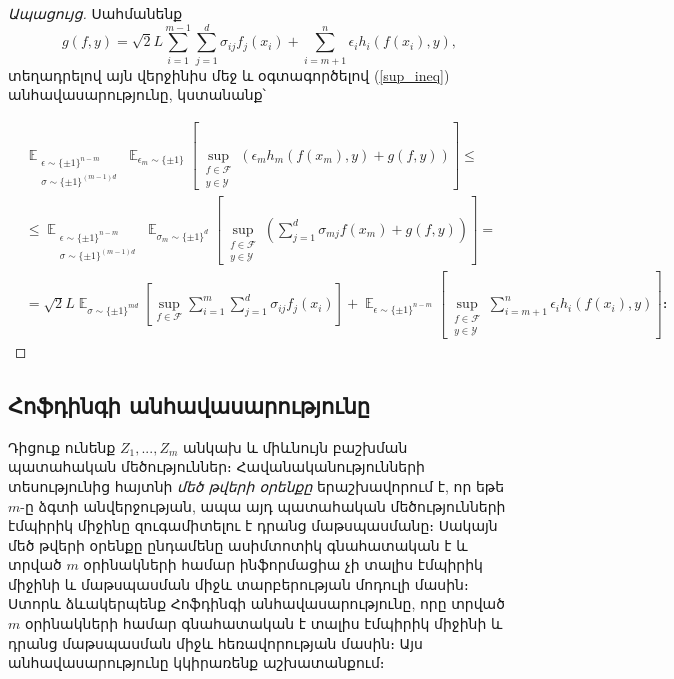 \documentclass[12pt]{article}
\DeclareMathOperator*{\E}{\mathbb{E}}
\begin{document}
\begin{proof}[Ապացույց]
Սահմանենք $$g(f, y) = \sqrt{2}L\sum_{i=1}^{m-1}\sum_{j=1}^d{\sigma_{ij}f_j(x_i)}  + \sum_{i = m+1}^n\epsilon_ih_i(f(x_i), y),$$ տեղադրելով այն վերջինիս մեջ և օգտագործելով (\ref{sup_ineq}) անհավասարությունը, կստանանք՝


\begin{align*}
 &\E_{\substack{\epsilon \sim \{ \pm 1\}^{n-m}   \\ \sigma \sim \{ \pm 1\}^{(m-1)d} }}     \E_{\epsilon_m \sim \{ \pm1 \}} \left [          \sup_{\substack{f \in \mathcal{F} \\ y \in \mathcal{Y}}}     \left(\epsilon_m h_m(f(x_m), y)   +   g(f, y)			\right )	\right ] \leq \\
 &\leq  \E_{\substack{\epsilon \sim \{ \pm 1\}^{n-m}   \\ \sigma \sim \{ \pm 1\}^{(m-1)d} }}     \E_{\sigma_m \sim \{ \pm1 \}^d} \left [          \sup_{\substack{f \in \mathcal{F} \\ y \in \mathcal{Y}}}     \left( \sum_{j = 1}^d  \sigma_{mj}f(x_m) +   g(f, y)			\right )	\right ] =\\
 &= \sqrt{2}L \E_{\sigma \sim \{\pm1\}^{md}} \left[  \sup_{f \in \mathcal{F}}  \sum_{i=1}^m\sum_{j=1}^d{\sigma_{ij}f_j(x_i)}   \right] + \E_{\epsilon \sim \{\pm 1\}^{n-m}}\left[\sup_{\substack{f \in \mathcal{F} \\ y \in \mathcal{Y}} }  \sum_{i=m+1}^n{\epsilon_ih_i(f(x_i), y)}  \right] ։
\end{align*}


\end{proof}
  




{}


\subsection*{\hfill Հոֆդինգի անհավասարությունը \hfill} \noindent

 Դիցուք ունենք $Z_1, ..., Z_m$ անկախ և միևնույն բաշխման պատահական մեծություններ։ Հավանականությունների տեսությունից հայտնի \textit{մեծ թվերի օրենքը} երաշխավորում է, որ եթե $m$-ը ձգտի անվերջության, ապա
 այդ պատահական մեծությունների էմպիրիկ միջինը զուգամիտելու է դրանց մաթսպասմանը։ Սակայն մեծ թվերի օրենքը ընդամենը ասիմտոտիկ գնահատական է և տրված $m$ օրինակների համար ինֆորմացիա չի տալիս էմպիրիկ միջինի և մաթսպասման միջև տարբերության մոդուլի մասին։ Ստորև ձևակերպենք Հոֆդինգի անհավասարությունը, որը տրված $m$ օրինակների համար գնահատական է տալիս էմպիրիկ միջինի և դրանց մաթսպասման  միջև հեռավորության մասին։ Այս անհավասարությունը կկիրառենք աշխատանքում։ 
\end{document}
